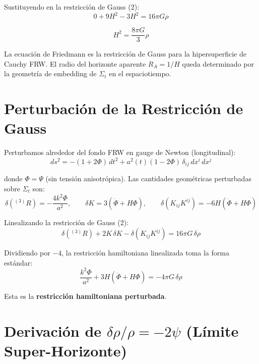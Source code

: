 \documentclass[12pt,a4paper]{article}
\begin{document}
Sustituyendo en la restricción de Gauss (2):
\begin{equation}
0 + 9H^2 - 3H^2 = 16\pi G\rho \tag{6}
\end{equation}

\begin{equation}
\boxed{H^2 = \frac{8\pi G}{3}\rho} \tag{7}
\end{equation}

La ecuación de Friedmann es la restricción de Gauss para la hipersuperficie de Cauchy FRW. El radio del horizonte aparente $R_A = 1/H$ queda determinado por la geometría de embedding de $\Sigma_t$ en el espaciotiempo.

\section{Perturbación de la Restricción de Gauss}

Perturbamos alrededor del fondo FRW en gauge de Newton (longitudinal):
\begin{equation}
ds^2 = -(1+2\Phi)\,dt^2 + a^2(t)(1-2\Phi)\,\delta_{ij}\,dx^i\,dx^j \tag{8}
\end{equation}

donde $\Phi = \Psi$ (sin tensión anisotrópica). Las cantidades geométricas perturbadas sobre $\Sigma_t$ son:
\begin{equation}
\delta\!\left({}^{(3)}R\right) = -\frac{4k^2\Phi}{a^2}, \qquad \delta K = 3(\dot\Phi + H\Phi), \qquad \delta(K_{ij}K^{ij}) = -6H(\dot\Phi + H\Phi) \tag{9}
\end{equation}

Linealizando la restricción de Gauss (2):
\begin{equation}
\delta\!\left({}^{(3)}R\right) + 2K\,\delta K - \delta(K_{ij}K^{ij}) = 16\pi G\,\delta\rho \tag{10}
\end{equation}

Dividiendo por $-4$, la restricción hamiltoniana linealizada toma la forma estándar:
\begin{equation}
\frac{k^2\Phi}{a^2} + 3H(\dot\Phi + H\Phi) = -4\pi G\,\delta\rho \tag{11}
\end{equation}

Esta es la \textbf{restricción hamiltoniana perturbada}.

\section{Derivación de $\delta\rho/\rho = -2\psi$ (Límite Super-Horizonte)}
\end{document}
